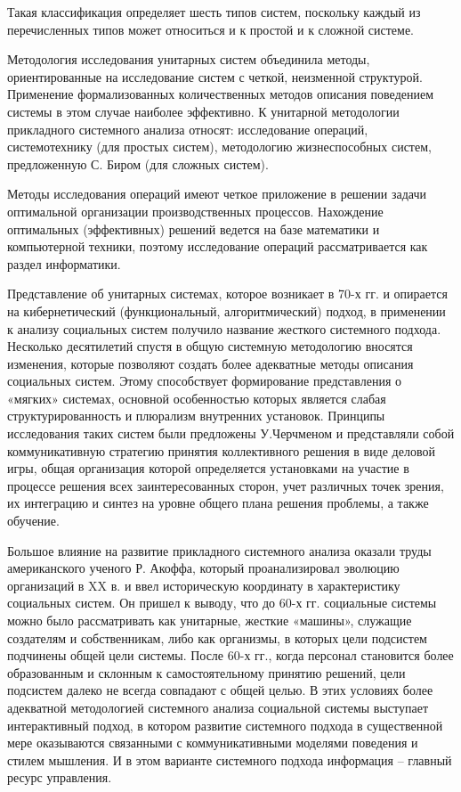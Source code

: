 \documentclass[exam_answers.tex]{subfiles}
\begin{document}
Такая классификация определяет шесть типов систем, поскольку каждый
из перечисленных типов может относиться и к простой и к сложной системе.

Методология исследования унитарных систем объединила методы,
ориентированные на исследование систем с четкой, неизменной структурой.
Применение формализованных количественных методов описания поведением
системы в этом случае наиболее эффективно. К унитарной методологии
прикладного системного анализа относят: исследование операций,
системотехнику (для простых систем), методологию жизнеспособных систем,
предложенную С. Биром (для сложных систем).

Методы исследования операций имеют четкое приложение в решении
задачи оптимальной организации производственных процессов. Нахождение
оптимальных (эффективных) решений ведется на базе математики и
компьютерной техники, поэтому исследование операций рассматривается как
раздел информатики.

Представление об унитарных системах, которое возникает в 70-х гг. и
опирается на кибернетический (функциональный, алгоритмический) подход, в
применении к анализу социальных систем получило название жесткого
системного подхода. Несколько десятилетий спустя в общую системную
методологию вносятся изменения, которые позволяют создать более
адекватные методы описания социальных систем. Этому способствует
формирование представления о «мягких» системах, основной особенностью
которых является слабая структурированность и плюрализм внутренних
установок. Принципы исследования таких систем были предложены
У.Черчменом и представляли собой коммуникативную стратегию принятия
коллективного решения в виде деловой игры, общая организация которой
определяется установками на участие в процессе решения всех
заинтересованных сторон, учет различных точек зрения, их интеграцию и
синтез на уровне общего плана решения проблемы, а также обучение.

Большое влияние на развитие прикладного системного анализа оказали
труды американского ученого Р. Акоффа, который проанализировал эволюцию
организаций в XX в. и ввел историческую координату в характеристику
социальных систем. Он пришел к выводу, что до 60-х гг. социальные системы
можно было рассматривать как унитарные, жесткие «машины», служащие
создателям и собственникам, либо как организмы, в которых цели подсистем
подчинены общей цели системы. После 60-х гг., когда персонал становится
более образованным и склонным к самостоятельному принятию решений, цели
подсистем далеко не всегда совпадают с общей целью. В этих условиях более
адекватной методологией системного анализа социальной системы выступает
интерактивный подход, в котором развитие системного подхода в
существенной мере оказываются связанными с коммуникативными моделями
поведения и стилем мышления. И в этом варианте системного подхода
информация – главный ресурс управления.
\end{document}

